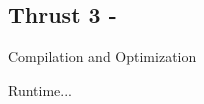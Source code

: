 \subsection{Thrust 3 - }


\begin{goal} 
Compilation and Optimization
\end{goal}



\begin{goal} 
Runtime...
\end{goal}






